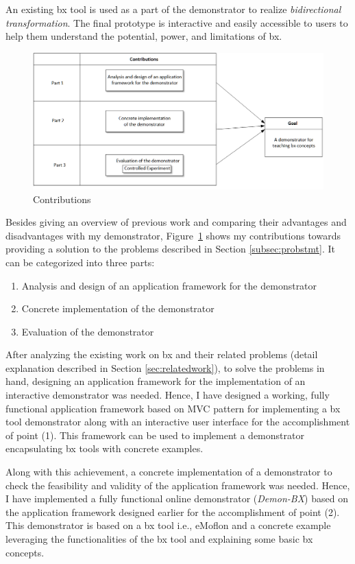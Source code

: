 An existing bx tool is used as a part of the demonstrator to realize \textit{bidirectional transformation}. The final prototype is interactive and easily accessible to users to help them understand the potential, power, and limitations of bx.

\begin{figure}[h]
	\centering
	\includegraphics[width=1\textwidth]{figures/Contribution}
	\caption{Contributions}
	\label{fig:Contribution}
\end{figure}

Besides giving an overview of previous work and comparing their advantages and disadvantages with my demonstrator, Figure~\ref{fig:Contribution} shows my contributions towards providing a solution to the problems described in Section \ref{subsec:probstmt}. It can be categorized into three parts: 

\begin{enumerate} 
	\item {Analysis and design of an application framework for the demonstrator} 
	\item {Concrete implementation of the demonstrator}
	\item {Evaluation of the demonstrator}
\end{enumerate}

After analyzing the existing work on bx and their related problems (detail explanation described in Section \ref{sec:relatedwork}), to solve the problems in hand, designing an application framework for the implementation of an interactive demonstrator was needed. Hence, I have designed a working, fully functional application framework based on MVC pattern for implementing a bx tool demonstrator along with an interactive user interface for the accomplishment of point (1). This framework can be used to implement a demonstrator encapsulating bx tools with concrete examples.

Along with this achievement, a concrete implementation of a demonstrator to check the feasibility and validity of the application framework was needed. Hence, I have implemented a fully functional online demonstrator (\textit{\ac{Demon-BX}}) based on the application framework designed earlier for the accomplishment of point (2). This demonstrator is based on a bx tool i.e., eMoflon and a concrete example leveraging the functionalities of the bx tool and explaining some basic bx concepts. 

